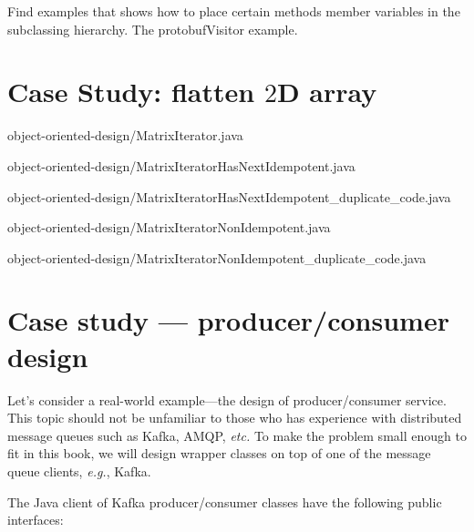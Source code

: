 \documentclass[oneside,11pt]{book}
\theoremstyle{definition}
\theoremstyle{remark}
\newcommand{\java}{Java }
\begin{document}
Find examples that shows how to place certain methods member variables in the subclassing
hierarchy.
The protobufVisitor example.

\begin{clisting}
    
\end{clisting}

\section{Case Study: flatten $2$D array}\label{sec:caseStudy:FlattenArray}


{object-oriented-design/MatrixIterator.java}


{object-oriented-design/MatrixIteratorHasNextIdempotent.java}


{object-oriented-design/MatrixIteratorHasNextIdempotent_duplicate_code.java}


{object-oriented-design/MatrixIteratorNonIdempotent.java}


{object-oriented-design/MatrixIteratorNonIdempotent_duplicate_code.java}


\section{Case study --- producer/consumer design}\label{sec:case-study-producer-consumer-design}

Let's consider a real-world example---the design of producer/consumer service.
This topic should not be unfamiliar to those who has experience with distributed message queues
such as Kafka, AMQP, \textit{etc.}
To make the problem small enough to fit in this book, we will design wrapper classes on top of
one of the message queue clients, \textit{e.g.}, Kafka.


The \java client of Kafka producer/consumer classes have the following public interfaces:
\end{document}

